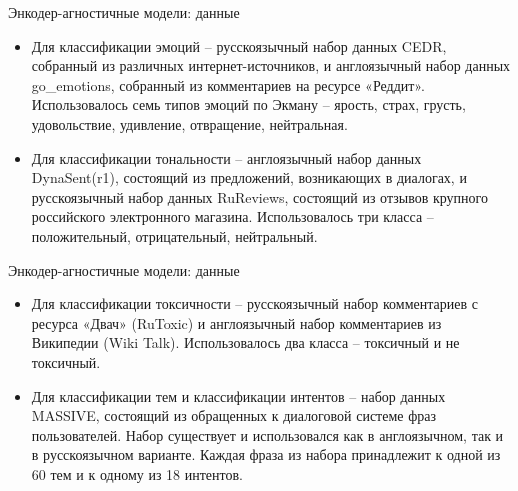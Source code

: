 \begin{frame}{Энкодер-агностичные модели: данные}
\begin{itemize}
    \item Для классификации эмоций -- русскоязычный набор данных CEDR, собранный из различных интернет-источников, и англоязычный набор данных go\_emotions, собранный из комментариев на ресурсе «Реддит». Использовалось семь типов эмоций по Экману -- ярость, страх, грусть, удовольствие, удивление, отвращение, нейтральная.
    \item Для классификации тональности -- англоязычный набор данных DynaSent(r1), состоящий из предложений, возникающих в диалогах, и русскоязычный набор данных RuReviews, состоящий из отзывов крупного российского электронного магазина. Использовалось три класса -- положительный, отрицательный, нейтральный.
\end{itemize}
\end{frame}

\begin{frame}{Энкодер-агностичные модели: данные}
\begin{itemize}
    \item Для классификации токсичности -- русскоязычный набор комментариев с ресурса «Двач» (RuToxic) и англоязычный набор комментариев из Википедии (Wiki Talk). Использовалось два класса -- токсичный и не токсичный.
    \item Для классификации тем и классификации интентов -- набор данных MASSIVE, состоящий из обращенных к диалоговой системе фраз пользователей. Набор существует и использовался как в англоязычном, так и в русскоязычном варианте. Каждая фраза из набора принадлежит к одной из 60 тем и к одному из 18 интентов.
\end{itemize}
\end{frame}

